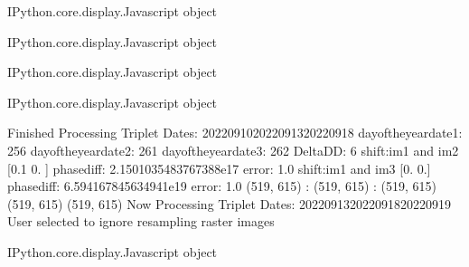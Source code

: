\documentclass[letterpaper,10pt]{sphinxmanual}
\begin{document}
\begin{sphinxVerbatim}[commandchars=\\\{\}]
\PYGZlt{}IPython.core.display.Javascript object\PYGZgt{}
\end{sphinxVerbatim}



\begin{sphinxVerbatim}[commandchars=\\\{\}]
\PYGZlt{}IPython.core.display.Javascript object\PYGZgt{}
\end{sphinxVerbatim}



\begin{sphinxVerbatim}[commandchars=\\\{\}]
\PYGZlt{}IPython.core.display.Javascript object\PYGZgt{}
\end{sphinxVerbatim}



\begin{sphinxVerbatim}[commandchars=\\\{\}]
\PYGZlt{}IPython.core.display.Javascript object\PYGZgt{}
\end{sphinxVerbatim}



\begin{sphinxVerbatim}[commandchars=\\\{\}]
Finished Processing Triplet Dates:  20220910\PYGZhy{}20220913\PYGZhy{}20220918
day\PYGZus{}of\PYGZus{}the\PYGZus{}year\PYGZus{}date1:  256
\PYGZhy{}\PYGZhy{}\PYGZhy{}\PYGZhy{}\PYGZhy{}\PYGZhy{}\PYGZhy{}\PYGZhy{}\PYGZhy{}\PYGZhy{}\PYGZhy{}\PYGZhy{}\PYGZhy{}\PYGZhy{}\PYGZhy{}\PYGZhy{}\PYGZhy{}\PYGZhy{}\PYGZhy{}\PYGZhy{}\PYGZhy{}
day\PYGZus{}of\PYGZus{}the\PYGZus{}year\PYGZus{}date2:  261
\PYGZhy{}\PYGZhy{}\PYGZhy{}\PYGZhy{}\PYGZhy{}\PYGZhy{}\PYGZhy{}\PYGZhy{}\PYGZhy{}\PYGZhy{}\PYGZhy{}\PYGZhy{}\PYGZhy{}\PYGZhy{}\PYGZhy{}\PYGZhy{}\PYGZhy{}\PYGZhy{}\PYGZhy{}\PYGZhy{}\PYGZhy{}
day\PYGZus{}of\PYGZus{}the\PYGZus{}year\PYGZus{}date3:  262
\PYGZhy{}\PYGZhy{}\PYGZhy{}\PYGZhy{}\PYGZhy{}\PYGZhy{}\PYGZhy{}\PYGZhy{}\PYGZhy{}\PYGZhy{}\PYGZhy{}\PYGZhy{}\PYGZhy{}\PYGZhy{}\PYGZhy{}\PYGZhy{}\PYGZhy{}\PYGZhy{}\PYGZhy{}\PYGZhy{}\PYGZhy{}
Delta\PYGZus{}DD: 6
shift:im1 and im2 [\PYGZhy{}0.1  0. ] phasediff: 2.1501035483767388e\PYGZhy{}17 error: 1.0
shift:im1 and im3 [0. 0.] phasediff: \PYGZhy{}6.594167845634941e\PYGZhy{}19 error: 1.0
(519, 615) :  (519, 615) :  (519, 615)
(519, 615)
(519, 615)
Now Processing Triplet Dates:  20220913\PYGZhy{}20220918\PYGZhy{}20220919
 User selected to ignore resampling raster images 



\PYGZlt{}IPython.core.display.Javascript object\PYGZgt{}
\end{sphinxVerbatim}
\end{document}
